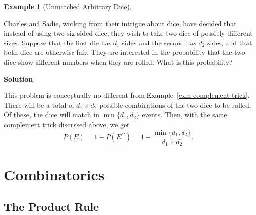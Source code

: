 \documentclass[
  letterpaper,
  DIV=11,
  numbers=noendperiod]{scrreprt}
\theoremstyle{definition}
\theoremstyle{definition}
\theoremstyle{definition}
\newtheorem{example}{Example}[chapter]
\theoremstyle{remark}
\begin{document}
\begin{example}[Unmatched Arbitrary
Dice]\protect\hypertarget{exm-complement-trick-two}{}\label{exm-complement-trick-two}

Charles and Sadie, working from their intrigue about dice, have decided
that instead of using two six-sided dice, they wish to take two dice of
possibly different sizes. Suppose that the first die has \(d_1\) sides
and the second has \(d_2\) sides, and that both dice are otherwise fair.
They are interested in the probability that the two dice show different
numbers when they are rolled. What is this probability?

\begin{tcolorbox}[enhanced jigsaw, colback=white, breakable, rightrule=.15mm, leftrule=.75mm, toprule=.15mm, left=2mm, arc=.35mm, opacityback=0, bottomrule=.15mm]

\vspace{-3mm}\textbf{Solution}\vspace{3mm}

This problem is conceptually no different from
Example~\ref{exm-complement-trick}. There will be a total of
\(d_1\times d_2\) possible combinations of the two dice to be
rolled.\footnotemark{} Of these, the dice will match in
\(\min\{d_1, d_2\}\) events.\footnotemark{} Then, with the same
complement trick discussed above, we get
\[P(E) = 1 - P(E^C) = 1 - \frac{\min\{d_1,d_2\}}{d_1\times d_2}.\]

\end{tcolorbox}



\end{example}

\section{Combinatorics}\label{combinatorics}

\subsection{The Product Rule}\label{the-product-rule}
\end{document}
